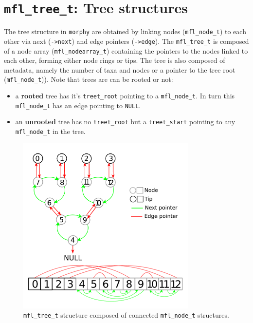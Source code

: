 \documentclass[a4paper,12pt]{article}
\newcommand{\morphy}{\texttt{morphy} }
\begin{document}
\section{\texttt{mfl\_tree\_t}: Tree structures}

The tree structure in \morphy are obtained by linking nodes (\texttt{mfl\_node\_t}) to each other via next (\texttt{->next}) and edge pointers (\texttt{->edge}).
The \texttt{mfl\_tree\_t} is composed of a node array (\texttt{mfl\_nodearray\_t}) containing the pointers to the nodes linked to each other, forming either node rings or tips.
The tree is also composed of metadata, namely the number of taxa and nodes or a pointer to the tree root (\texttt{mfl\_node\_t})).
Note that trees are can be rooted or not:
\begin{itemize}
    \item a \textbf{rooted} tree has it's \texttt{treet\_root} pointing to a \texttt{mfl\_node\_t}.
    In turn this \texttt{mfl\_node\_t} has an edge pointing to \texttt{NULL}.
    \item an \textbf{unrooted} tree has no \texttt{treet\_root} but a \texttt{treet\_start} pointing to any \texttt{mfl\_node\_t} in the tree.
\end{itemize}

\begin{figure}[!htbp]
\centering
    \includegraphics[keepaspectratio=true, width=0.8\textwidth]{Figures/tree_struct.pdf}
\caption{\texttt{mfl\_tree\_t} structure composed of connected \texttt{mfl\_node\_t} structures.}
\label{fig:Fig_tree_struct}
\end{figure}
\end{document}

